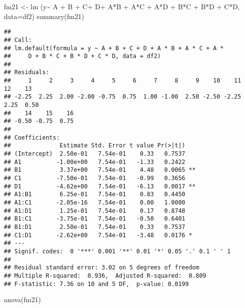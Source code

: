 \documentclass[
]{book}
\newenvironment{Shaded}{\begin{snugshade}}{\end{snugshade}}
\newcommand{\AttributeTok}[1]{\textcolor[rgb]{0.77,0.63,0.00}{#1}}
\newcommand{\FunctionTok}[1]{\textcolor[rgb]{0.00,0.00,0.00}{#1}}
\newcommand{\NormalTok}[1]{#1}
\newcommand{\OtherTok}[1]{\textcolor[rgb]{0.56,0.35,0.01}{#1}}
\newcommand{\SpecialCharTok}[1]{\textcolor[rgb]{0.00,0.00,0.00}{#1}}
\begin{document}
\begin{Shaded}
\begin{Highlighting}[]
\NormalTok{fm21 }\OtherTok{\textless{}{-}} \FunctionTok{lm}\NormalTok{ (y}\SpecialCharTok{\textasciitilde{}}\NormalTok{ A }\SpecialCharTok{+}\NormalTok{ B }\SpecialCharTok{+}\NormalTok{ C}\SpecialCharTok{+}\NormalTok{ D}\SpecialCharTok{+}\NormalTok{ A}\SpecialCharTok{*}\NormalTok{B }\SpecialCharTok{+}\NormalTok{ A}\SpecialCharTok{*}\NormalTok{C }\SpecialCharTok{+}\NormalTok{ A}\SpecialCharTok{*}\NormalTok{D }\SpecialCharTok{+}\NormalTok{ B}\SpecialCharTok{*}\NormalTok{C }\SpecialCharTok{+}\NormalTok{ B}\SpecialCharTok{*}\NormalTok{D }\SpecialCharTok{+}\NormalTok{ C}\SpecialCharTok{*}\NormalTok{D, }\AttributeTok{data=}\NormalTok{df2) }
\FunctionTok{summary}\NormalTok{(fm21)}
\end{Highlighting}
\end{Shaded}

\begin{verbatim}
## 
## Call:
## lm.default(formula = y ~ A + B + C + D + A * B + A * C + A * 
##     D + B * C + B * D + C * D, data = df2)
## 
## Residuals:
##     1     2     3     4     5     6     7     8     9    10    11    12    13 
## -2.25  2.25  2.00 -2.00 -0.75  0.75  1.00 -1.00  2.50 -2.50 -2.25  2.25  0.50 
##    14    15    16 
## -0.50 -0.75  0.75 
## 
## Coefficients:
##              Estimate Std. Error t value Pr(>|t|)   
## (Intercept)  2.50e-01   7.54e-01    0.33   0.7537   
## A1          -1.00e+00   7.54e-01   -1.33   0.2422   
## B1           3.37e+00   7.54e-01    4.48   0.0065 **
## C1          -7.50e-01   7.54e-01   -0.99   0.3656   
## D1          -4.62e+00   7.54e-01   -6.13   0.0017 **
## A1:B1        6.25e-01   7.54e-01    0.83   0.4450   
## A1:C1       -2.05e-16   7.54e-01    0.00   1.0000   
## A1:D1        1.25e-01   7.54e-01    0.17   0.8748   
## B1:C1       -3.75e-01   7.54e-01   -0.50   0.6401   
## B1:D1        2.50e-01   7.54e-01    0.33   0.7537   
## C1:D1       -2.62e+00   7.54e-01   -3.48   0.0176 * 
## ---
## Signif. codes:  0 '***' 0.001 '**' 0.01 '*' 0.05 '.' 0.1 ' ' 1
## 
## Residual standard error: 3.02 on 5 degrees of freedom
## Multiple R-squared:  0.936,  Adjusted R-squared:  0.809 
## F-statistic: 7.36 on 10 and 5 DF,  p-value: 0.0199
\end{verbatim}

\begin{Shaded}
\begin{Highlighting}[]
\FunctionTok{anova}\NormalTok{(fm21)}
\end{Highlighting}
\end{Shaded}
\end{document}
